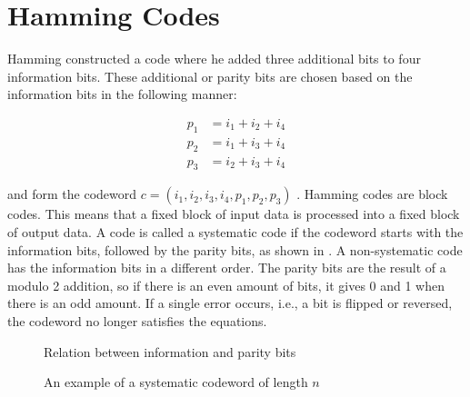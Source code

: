 \documentclass[../main.tex]{subfiles}
\begin{document}
    \section{Hamming Codes}
    Hamming constructed a code where he added three additional bits to four information bits. These additional or parity bits are chosen based on the information bits in the following manner:

    \begin{align*}
        p_1 &= i_1 + i_2 + i_4\\
        p_2 &= i_1 + i_3 + i_4\\
        p_3 &= i_2 + i_3 + i_4
    \end{align*}

    \noindent
    and form the codeword $c=(i_1, i_2, i_3, i_4, p_1, p_2, p_3)$ . Hamming codes are block codes. This means that a fixed block of input data is processed into a fixed block of output data. A code is called a systematic code if the codeword starts with the information bits, followed by the parity bits, as shown in . A non-systematic code has the information bits in a different order. The parity bits are the result of a modulo 2 addition, so if there is an even amount of bits, it gives 0 and 1 when there is an odd amount. If a single error occurs, i.e., a bit is flipped or reversed, the codeword no longer satisfies the equations.

    \begin{figure}[htp]
        \centering
        \caption{Relation between information and parity bits}
        \label{fig:information_and_parity_bits}
    \end{figure}

    \begin{figure}[htp]
        \centering
        \caption{An example of a systematic codeword of length $n$}
        \label{fig:systematic_codeword}
    \end{figure}
\end{document}
